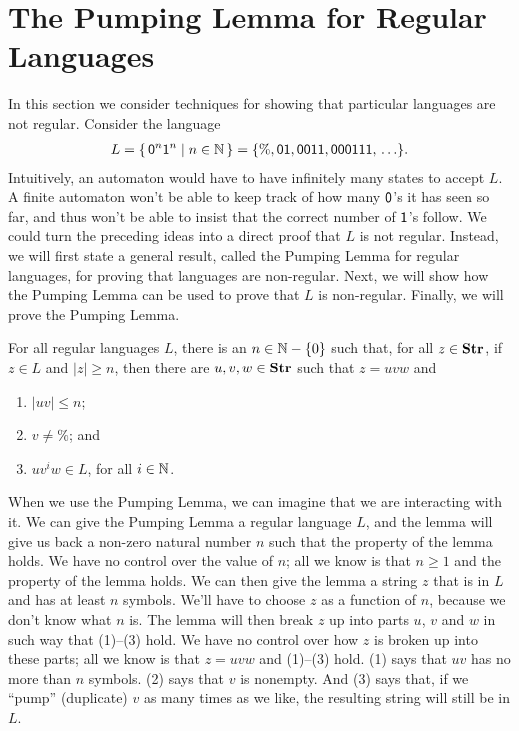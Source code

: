 \section{The Pumping Lemma for Regular Languages}
\label{ThePumpingLemmaForRegularLanguages}

%
%
%
In this section we consider techniques for showing that
particular languages are not regular.
Consider the language
\begin{gather*}
L=\{ \, \mathsf{0}^n\mathsf{1}^n \mid n\in\mathbb{N} \, \} =
\mathsf{\{\%, 01, 0011, 000111,\,\ldots\}} .
\end{gather*}
Intuitively, an automaton would have to have infinitely many states to
accept $L$.  A finite automaton won't be able to keep track of how
many $\mathsf{0}$'s it has seen so far, and thus won't be able to insist
that the correct number of $\mathsf{1}$'s follow.  We could turn the
preceding ideas into a direct proof that $L$ is not regular.  Instead,
we will first state a general result, called the Pumping Lemma for
regular languages, for proving that languages are non-regular.  Next,
we will show how the Pumping Lemma can be used to prove that $L$ is
non-regular.  Finally, we will prove the Pumping Lemma.

\begin{lemma}
For all regular languages $L$, there is an $n\in\mathbb{N}-\{0\}$ such that,
for all $z\in\mathbf{Str}$, if $z\in L$ and $|z|\geq n$, then
there are $u,v,w\in\mathbf{Str}$ such that $z=uvw$ and
\begin{enumerate}[\quad(1)]
\item $|uv|\leq n$;

\item $v\neq\%$; and

\item $uv^iw\in L$, for all $i\in\mathbb{N}$.
\end{enumerate}
\end{lemma}

When we use the Pumping Lemma, we can imagine that we are interacting
with it.  We can give the Pumping Lemma a regular language $L$, and
the lemma will give us back a non-zero natural number $n$ such that
the property of the lemma holds.  We have no control over the value of
$n$; all we know is that $n\geq 1$ and the property of the lemma holds.
We can then give the lemma a string $z$ that is in $L$ and has at
least $n$ symbols. We'll have to choose $z$ as a function of $n$,
because we don't know what $n$ is. The lemma will then break $z$ up
into parts $u$, $v$ and $w$ in such way that (1)--(3) hold.  We have
no control over how $z$ is broken up into these parts; all we know is
that $z=uvw$ and (1)--(3) hold.  (1) says that $uv$ has no more than
$n$ symbols.  (2) says that $v$ is nonempty.  And (3) says that, if we
``pump'' (duplicate) $v$ as many times as we like, the resulting
string will still be in $L$.

